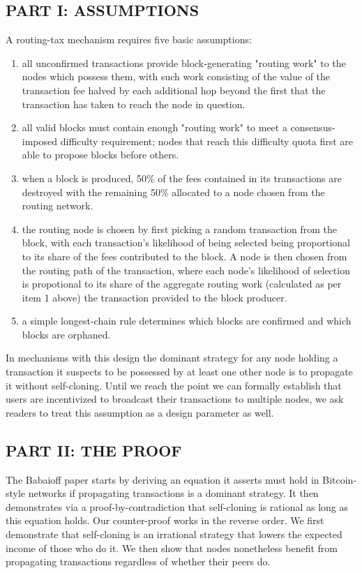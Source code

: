 \documentclass[oneside]{article}   	%
\begin{document}
\begin{multicols}{2}
\subsection*{PART I: ASSUMPTIONS}

A routing-tax mechanism requires five basic assumptions:

\begin{enumerate}
  \item all unconfirmed transactions provide block-generating "routing work" to the nodes which possess them, with such work consisting of the value of the transaction fee halved by each additional hop beyond the first that the transaction has taken to reach the node in question.
  \item all valid blocks must contain enough "routing work" to meet a consensus-imposed difficulty requirement; nodes that reach this difficulty quota first are able to propose blocks before others.
  \item when a block is produced, 50\% of the fees contained in its transactions are destroyed with the remaining 50\% allocated to a node chosen from the routing network.
  \item the routing node is chosen by first picking a random transaction from the block, with each transaction's likelihood of being selected being proportional to its share of the fees contributed to the block. A node is then chosen from the routing path of the transaction, where each node's likelihood of selection is propotional to its share of the aggregate routing work (calculated as per item 1 above) the transaction provided to the block producer.
  \item a simple longest-chain rule determines which blocks are confirmed and which blocks are orphaned.

\end{enumerate}
In mechanisms with this design the dominant strategy for any node holding a transaction it suspects to be possessed by at least one other node is to propagate it without self-cloning. Until we reach the point we can formally establish that users are incentivized to broadcast their transactions to multiple nodes, we ask readers to treat this assumption as a design parameter as well.

\subsection*{PART II: THE PROOF}

The Babaioff paper starts by deriving an equation it asserts must hold in Bitcoin-style networks if propagating transactions is a dominant strategy. It then demonstrates via a proof-by-contradiction that self-cloning is rational as long as this equation holds. Our counter-proof works in the reverse order. We first demonstrate that self-cloning is an irrational strategy that lowers the expected income of those who do it. We then show that nodes nonetheless benefit from propagating transactions regardless of whether their peers do.


\end{multicols}
\end{document}
